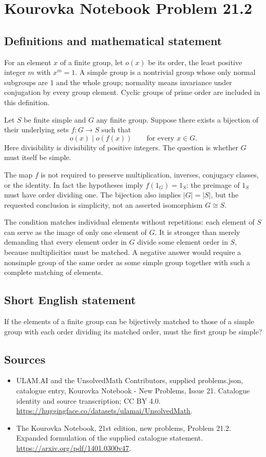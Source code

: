 \documentclass[11pt,a4paper]{article}
\begin{document}
\section*{Kourovka Notebook Problem 21.2}\label{statement}

\subsection{Definitions and mathematical statement}
For an element $x$ of a finite group, let $o(x)$ be its order, the least
positive integer $m$ with $x^m=1$. A simple group is a nontrivial group
whose only normal subgroups are $1$ and the whole group; normality means
invariance under conjugation by every group element. Cyclic groups of
prime order are included in this definition.

Let $S$ be finite simple and $G$ any finite group. Suppose there exists
a bijection of their underlying sets $f:G\to S$ such that
\[
 o(x)\mid o(f(x))\qquad\text{for every }x\in G.
\]
Here divisibility is divisibility of positive integers. The question is
whether $G$ must itself be simple.

The map $f$ is not required to preserve multiplication, inverses,
conjugacy classes, or the identity. In fact the hypotheses imply
$f(1_G)=1_S$: the preimage of $1_S$ must have order dividing one.
The bijection also implies $|G|=|S|$, but the requested conclusion is
simplicity, not an asserted isomorphism $G\cong S$.

The condition matches individual elements without repetitions: each
element of $S$ can serve as the image of only one element of $G$.
It is stronger than merely demanding that every element order in $G$
divide some element order in $S$, because multiplicities must be matched.
A negative answer would require a nonsimple group of the same order as
some simple group together with such a complete matching of elements.
\subsection{Short English statement}
If the elements of a finite group can be bijectively matched to those of a simple group with each order dividing its matched order, must the first group be simple?
\subsection{Sources}
\begin{itemize}
\item[S1] ULAM.AI and the UnsolvedMath Contributors, supplied problems.json, catalogue entry, Kourovka Notebook - New Problems, Issue 21. Catalogue identity and source transcription; CC BY 4.0.
\url{https://huggingface.co/datasets/ulamai/UnsolvedMath}.
\item[S2] The Kourovka Notebook, 21st edition, new problems, Problem 21.2. Expanded formulation of the supplied catalogue statement.
\url{https://arxiv.org/pdf/1401.0300v47}.
\end{itemize}
\end{document}
